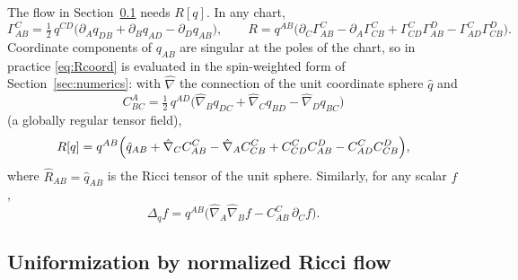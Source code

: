 \documentclass[11pt]{article}
\begin{document}
The flow in Section~\ref{sec:ricciflow} needs $R[q]$.  In any chart,
\begin{equation}
  \Gamma^C_{AB} = \tfrac12\, q^{CD}\bigl(\partial_A q_{DB}
                  + \partial_B q_{AD} - \partial_D q_{AB}\bigr),
  \qquad
  R = q^{AB}\bigl(\partial_C\Gamma^C_{AB} - \partial_A\Gamma^C_{CB}
      + \Gamma^C_{CD}\Gamma^D_{AB} - \Gamma^C_{AD}\Gamma^D_{CB}\bigr).
  \label{eq:Rcoord}
\end{equation}
Coordinate components of $q_{AB}$ are singular at the poles of the chart, so
in practice \eqref{eq:Rcoord} is evaluated in the spin-weighted form of
Section~\ref{sec:numerics}: with $\hat\nabla$ the connection of the unit
coordinate sphere $\hat q$ and
\begin{equation}
  C^A_{BC} = \tfrac12\, q^{AD}\bigl(\hat\nabla_B q_{DC}
             + \hat\nabla_C q_{BD} - \hat\nabla_D q_{BC}\bigr)
  \label{eq:Cdiff}
\end{equation}
(a globally regular tensor field),
\begin{equation}
  R[q] = q^{AB}\Bigl(\hat q_{AB}
         + \hat\nabla_C C^C_{AB} - \hat\nabla_A C^C_{CB}
         + C^C_{CD} C^D_{AB} - C^C_{AD} C^D_{CB}\Bigr),
  \label{eq:Reth}
\end{equation}
where $\hat R_{AB} = \hat q_{AB}$ is the Ricci tensor of the unit sphere.
Similarly, for any scalar $f$,
\begin{equation}
  \Delta_q f = q^{AB}\bigl(\hat\nabla_A\hat\nabla_B f
               - C^C_{AB}\,\partial_C f\bigr).
  \label{eq:lapeth}
\end{equation}

\subsection{Uniformization by normalized Ricci flow}
\label{sec:ricciflow}
\end{document}
